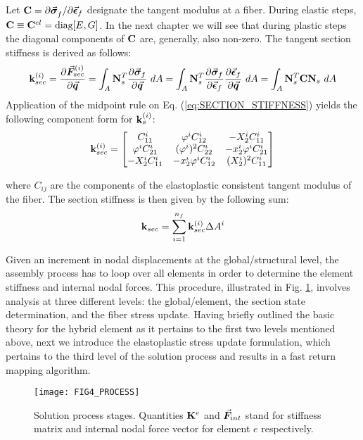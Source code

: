 Let $\mathbf{C}= \partial\vec{\bm{\sigma}}_f^{}/\partial\vec{\bm{\epsilon}}_f$ designate 
the tangent modulus at a fiber. During elastic steps,
$\mathbf{C}\equiv\mathbf{C}^{el} = \text{diag}[E,G]$. In the next chapter we will 
see that 
during plastic steps the
diagonal components of $\mathbf{C}$ are, generally, also non-zero. The tangent 
section stiffness is derived as follows:
\begin{equation}
	\bmat{k}^{(i)}_{sec} = \frac{\partial\bvec{F}_{sec}^{(i)} 
	}{\partial\bvec{q}} = 
	\int_A\bmat{N}_s^T\frac{\partial\bvec{\sigma}_f}{\partial\bvec{q}}\ dA=
	\int_A\bmat{N}_s^T\frac{\partial\bvec{\sigma}_f}{\partial\bvec{\epsilon}_f}
	\frac{\partial\bvec{\epsilon}_f}{\partial\bvec{q}}\
	dA = \int_A\bmat{N}_s^T\bmat{C}\bmat{N}_s\ dA
	\label{eq:SECTION_STIFFNESS}
\end{equation}
Application of the midpoint rule on Eq. (\ref{eq:SECTION_STIFFNESS}) yields the 
following component form for $\mathbf{k}^{(i)}_s$:
\begin{equation}
	\mathbf{k}^{(i)}_{sec} = \begin{bmatrix}
		C^i_{11}		& 		\varphi^iC^i_{12} & -X_2^iC^i_{11}\\
		\varphi^iC^i_{21}  &  (\varphi^i)^2C^i_{22}  &  
		-x_2^i\varphi^iC^i_{21}\\
		-X_2^iC^i_{11}  &  -x_2^i\varphi^iC^i_{12}   & (X_2^i)^2C^i_{11}
	\end{bmatrix}
	\label{eq:FIB_STIFF_CONTRIB}
\end{equation}

\noindent where $C_{ij}$ are the components of the elastoplastic consistent 
tangent modulus of the fiber. The section stiffness is then given by the 
following sum:
\begin{equation}
	\mathbf{k}_{sec} = \sum_{i=1}^{n_f}\mathbf{k}^{(i)}_{sec}\Delta A^i
	\label{eq:FIBER_CONTRIB_TO_STIFF}
\end{equation}

Given an increment in nodal displacements at the global/structural level, the
assembly process has to loop over all elements in order to determine the element
stiffness and internal nodal forces. This procedure, illustrated in
Fig. \ref{fig:FIG4_PROCESS}, involves analysis at three different levels: the 
global/element,
the section state determination, and the fiber stress update. Having briefly
outlined the basic theory for the hybrid element as it pertains to the first two
levels mentioned above, next we introduce the elastoplastic stress update 
formulation, which pertains to the third level of the solution process and
results in a fast return mapping algorithm.
\begin{figure}[t]
	\centering
	\texttt{[image: FIG4\_PROCESS]}
	\caption{Solution process stages. Quantities $\mathbf{K}^e$ and
		$\vec{\bm{F}}_{int}$ stand for stiffness matrix and internal nodal force 
		vector
		for element $e$ respectively.}
	\label{fig:FIG4_PROCESS}
\end{figure}

